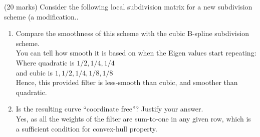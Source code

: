 (20 marks) Consider the following local subdivision matrix for a new subdivision scheme (a modification.. \\

\begin{enumerate}
\item Compare the smoothness of this scheme with the cubic B-spline subdivision scheme. \\
You can tell how smooth it is based on when the Eigen values start repeating: \\
Where quadratic is $1/2, 1/4, 1/4$ \\
and cubic is $1, 1/2, 1/4, 1/8, 1/8$ \\
Hence, this provided filter is less-smooth than cubic, and smoother than quadratic. \\
\item Is the resulting curve ``coordinate free''? Justify your answer. \\
Yes, as all the weights of the filter are sum-to-one in any given row, which is a sufficient condition for convex-hull property. \\
\end{enumerate}
